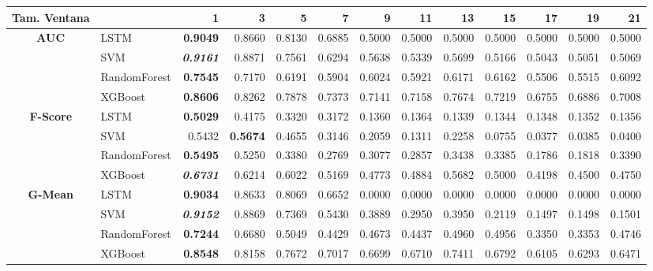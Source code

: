 \begin{table}[H]
\centering
\begin{adjustbox}{max width=14cm}
	\begin{tabular}{|c|l|r|r|r|r|r|r|r|r|r|r|r|}
		\hline
		\textbf{Tam. Ventana} &         &      1  &      3  &      5  &      7  &      9  &      11 &      13 &      15 &      17 &      19 &      21 \\
		\hline
		\textbf{AUC} &  LSTM & \textbf{  0.9049 } &  0.8660 &  0.8130 &  0.6885 &  0.5000 &  0.5000 &  0.5000 &  0.5000 &  0.5000 &  0.5000 &  0.5000 \\
		&  SVM & \textit{ \textbf{  0.9161 } } &  0.8871 &  0.7561 &  0.6294 &  0.5638 &  0.5339 &  0.5699 &  0.5166 &  0.5043 &  0.5051 &  0.5069 \\
		&  RandomForest & \textbf{  0.7545 } &  0.7170 &  0.6191 &  0.5904 &  0.6024 &  0.5921 &  0.6171 &  0.6162 &  0.5506 &  0.5515 &  0.6092 \\
		&  XGBoost & \textbf{  0.8606 } &  0.8262 &  0.7878 &  0.7373 &  0.7141 &  0.7158 &  0.7674 &  0.7219 &  0.6755 &  0.6886 &  0.7008 \\
		\hline
		\textbf{F-Score}&  LSTM & \textbf{  0.5029 } &  0.4175 &  0.3320 &  0.3172 &  0.1360 &  0.1364 &  0.1339 &  0.1344 &  0.1348 &  0.1352 &  0.1356 \\
		&  SVM &  0.5432 & \textbf{  0.5674 } &  0.4655 &  0.3146 &  0.2059 &  0.1311 &  0.2258 &  0.0755 &  0.0377 &  0.0385 &  0.0400 \\
		&  RandomForest & \textbf{  0.5495 } &  0.5250 &  0.3380 &  0.2769 &  0.3077 &  0.2857 &  0.3438 &  0.3385 &  0.1786 &  0.1818 &  0.3390 \\
		&  XGBoost & \textit{ \textbf{  0.6731 } } &  0.6214 &  0.6022 &  0.5169 &  0.4773 &  0.4884 &  0.5682 &  0.5000 &  0.4198 &  0.4500 &  0.4750 \\
		\hline
		\textbf{G-Mean} &  LSTM & \textbf{  0.9034 } &  0.8633 &  0.8069 &  0.6652 &  0.0000 &  0.0000 &  0.0000 &  0.0000 &  0.0000 &  0.0000 &  0.0000 \\
		&  SVM & \textit{ \textbf{  0.9152 } } &  0.8869 &  0.7369 &  0.5430 &  0.3889 &  0.2950 &  0.3950 &  0.2119 &  0.1497 &  0.1498 &  0.1501 \\
		&  RandomForest & \textbf{  0.7244 } &  0.6680 &  0.5049 &  0.4429 &  0.4673 &  0.4437 &  0.4960 &  0.4956 &  0.3350 &  0.3353 &  0.4746 \\
		&  XGBoost & \textbf{  0.8548 } &  0.8158 &  0.7672 &  0.7017 &  0.6699 &  0.6710 &  0.7411 &  0.6792 &  0.6105 &  0.6293 &  0.6471 \\

\end{tabular}
\end{adjustbox}
\end{table}
